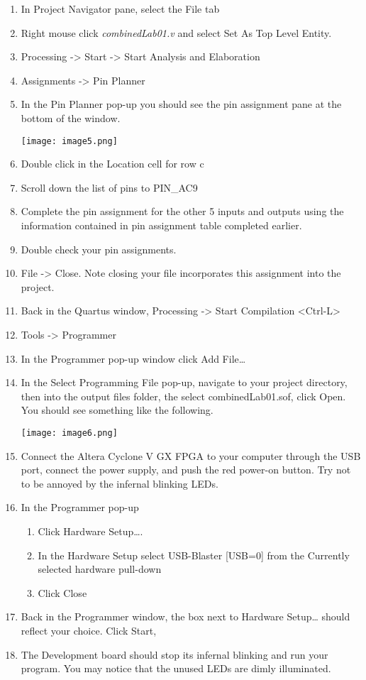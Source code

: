 \begin{enumerate}
\def\labelenumi{\arabic{enumi}.}
\item
  In Project Navigator pane, select the File tab
\item
  Right mouse click \emph{combinedLab01.v} and select Set As Top Level
  Entity.
\item
  Processing -\textgreater{} Start -\textgreater{} Start Analysis and
  Elaboration
\item
  Assignments -\textgreater{} Pin Planner
\item
  In the Pin Planner pop-up you should see the pin assignment pane at
  the bottom of the window.

\texttt{[image: image5.png]}

\item
  Double click in the Location cell for row c
\item
  Scroll down the list of pins to PIN\_AC9
\item
  Complete the pin assignment for the other 5 inputs and outputs using
  the information contained in pin assignment table completed earlier.
\item
  Double check your pin assignments.
\item
  File -\textgreater{} Close. Note closing your file incorporates this
  assignment into the project.
\item
  Back in the Quartus window, Processing -\textgreater{} Start
  Compilation \textless Ctrl-L\textgreater{}
\item
  Tools -\textgreater{} Programmer
\item
  In the Programmer pop-up window click Add File\ldots{}
\item
  In the Select Programming File pop-up, navigate to your project
  directory, then into the output files folder, the select
  combinedLab01.sof, click Open. You should see something like the
  following.
  
\texttt{[image: image6.png]}

\item
  Connect the Altera Cyclone V GX FPGA to your computer through the USB
  port, connect the power supply, and push the red power-on button. Try
  not to be annoyed by the infernal blinking LEDs.
\item
  In the Programmer pop-up

  \begin{enumerate}
  \def\labelenumii{\alph{enumii}.}
  \item
    Click Hardware Setup\ldots.
  \item
    In the Hardware Setup select USB-Blaster {[}USB=0{]} from the
    Currently selected hardware pull-down
  \item
    Click Close
  \end{enumerate}
\item
  Back in the Programmer window, the box next to Hardware Setup\ldots{}
  should reflect your choice. Click Start,
\item
  The Development board should stop its infernal blinking and run your
  program. You may notice that the unused LEDs are dimly illuminated.
\end{enumerate}


